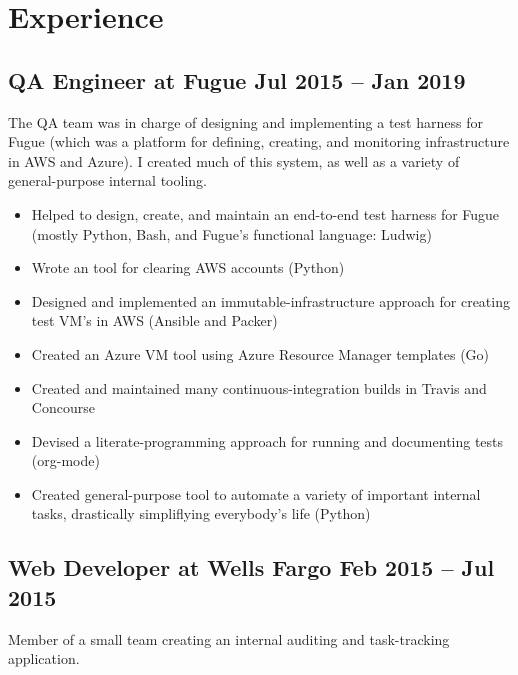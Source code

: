 \documentclass[12pt]{article}
\begin{document}

\section*{Experience}

\subsection*{QA Engineer at Fugue \hfill Jul 2015 -- Jan 2019}

The QA team was in charge of designing and implementing a test harness for Fugue
(which was a platform for defining, creating, and monitoring infrastructure in
AWS and Azure). I created much of this system, as well as a variety of
general-purpose internal tooling.

\begin{itemize}
\item Helped to design, create, and maintain an end-to-end test harness for
  Fugue (mostly Python, Bash, and Fugue's functional language: Ludwig)
\item Wrote an tool for clearing AWS accounts (Python)
\item Designed and implemented an immutable-infrastructure approach for creating
  test VM's in AWS (Ansible and Packer)
\item Created an Azure VM tool using Azure Resource Manager templates (Go)
\item Created and maintained many continuous-integration builds in Travis and
  Concourse
\item Devised a literate-programming approach for running and documenting tests
  (org-mode)
\item Created general-purpose tool to automate a variety of important internal
  tasks, drastically simpliflying everybody's life (Python)
\end{itemize}

     
 

\subsection*{Web Developer at Wells Fargo \hfill Feb 2015 -- Jul 2015}

Member of a small team creating an internal auditing and task-tracking
application.
\end{document}
